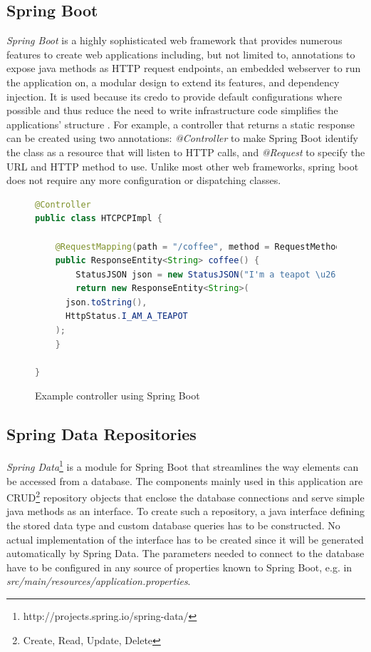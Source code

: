 \subsection{Spring Boot}
\textit{Spring Boot} is a highly sophisticated web framework that provides numerous features to create web applications including, but not limited to, annotations to expose java methods as HTTP request endpoints, an embedded webserver to run the application on, a modular design to extend its features, and dependency injection. It is used because its credo to provide default configurations where possible and thus reduce the need to write infrastructure code simplifies the applications' structure \cite[p. 6]{SpringGuide}.
For example, a controller that returns a static response can be created using two annotations:
\textit{@Controller} to make Spring Boot identify the class as a resource that will listen to HTTP calls, and \textit{@Request} to specify the URL and HTTP method to use. Unlike most other web frameworks, spring boot does not require any more configuration or dispatching classes.

\begin{figure}[h]
\begin{lstlisting}[language=Java]
@Controller
public class HTCPCPImpl {

	@RequestMapping(path = "/coffee", method = RequestMethod.GET)
	public ResponseEntity<String> coffee() {
		StatusJSON json = new StatusJSON("I'm a teapot \u2615");
		return new ResponseEntity<String>(
      json.toString(),
      HttpStatus.I_AM_A_TEAPOT
    );
	}

}
\end{lstlisting}
\caption[Example Controller]{Example controller using Spring Boot}
\end{figure}

\newpage
\subsection{Spring Data Repositories}
\textit{Spring Data}\footnote{http://projects.spring.io/spring-data/} is a module for Spring Boot that streamlines the way elements can be accessed from a database.
The components mainly used in this application are CRUD\footnote{Create, Read, Update, Delete} repository objects that enclose the database connections and serve
simple java methods as an interface. To create such a repository, a java interface defining the stored data type and custom database queries has to be constructed.
No actual implementation of the interface has to be created since it will be generated automatically by Spring Data.
The parameters needed to connect to the database have to be configured in any source of properties known to Spring Boot, e.g. in \textit{src/main/resources/application.properties}.

